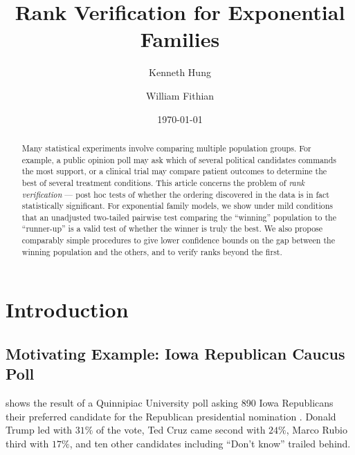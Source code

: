 \documentclass[11pt]{article}
\begin{document}
\title{Rank Verification for Exponential Families}
\author{Kenneth Hung \and William Fithian}
\date{\today}
\maketitle

\begin{abstract}
Many statistical experiments involve comparing multiple population groups. For example, a public opinion poll may ask which of several political candidates commands the most support, or a clinical trial may compare patient outcomes to determine the best of several treatment conditions. This article concerns the problem of {\em rank verification} --- post hoc tests of whether the ordering discovered in the data is in fact statistically significant. For exponential family models, we show under mild conditions that an unadjusted two-tailed pairwise test comparing the ``winning'' population to the ``runner-up'' is a valid test of whether the winner is truly the best. We also propose comparably simple procedures to give lower confidence bounds on the gap between the winning population and the others, and to verify ranks beyond the first.
\end{abstract}

\section{Introduction}
\label{sec:intro}

\subsection{Motivating Example: Iowa Republican Caucus Poll}
\label{sec:iowa}

 shows the result of a Quinnipiac University poll asking 890 Iowa Republicans their preferred candidate for the Republican presidential nomination \citep{quinnipiac}. Donald Trump led with $31\%$ of the vote, Ted Cruz came second with $24\%$, Marco Rubio third with $17\%$, and ten other candidates including ``Don't know'' trailed behind. 
\end{document}
